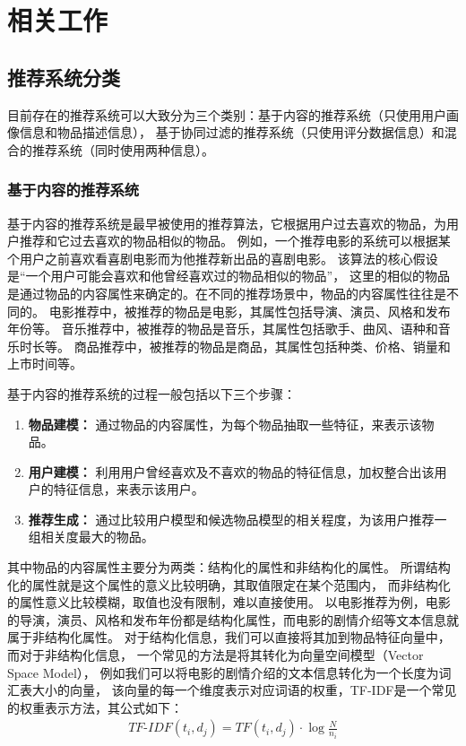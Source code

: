 \chapter{相关工作}
\section{推荐系统分类}
目前存在的推荐系统可以大致分为三个类别：基于内容的推荐系统（只使用用户画像信息和物品描述信息），
基于协同过滤的推荐系统（只使用评分数据信息）和混合的推荐系统（同时使用两种信息）。

\subsection{基于内容的推荐系统}
基于内容的推荐系统是最早被使用的推荐算法，它根据用户过去喜欢的物品，为用户推荐和它过去喜欢的物品相似的物品。
例如，一个推荐电影的系统可以根据某个用户之前喜欢看喜剧电影而为他推荐新出品的喜剧电影。
该算法的核心假设是``一个用户可能会喜欢和他曾经喜欢过的物品相似的物品''，
这里的相似的物品是通过物品的内容属性来确定的。在不同的推荐场景中，物品的内容属性往往是不同的。
电影推荐中，被推荐的物品是电影，其属性包括导演、演员、风格和发布年份等。
音乐推荐中，被推荐的物品是音乐，其属性包括歌手、曲风、语种和音乐时长等。
商品推荐中，被推荐的物品是商品，其属性包括种类、价格、销量和上市时间等。


基于内容的推荐系统的过程一般包括以下三个步骤：
\begin{enumerate}
\item \textbf{物品建模：} 通过物品的内容属性，为每个物品抽取一些特征，来表示该物品。
\item \textbf{用户建模：} 利用用户曾经喜欢及不喜欢的物品的特征信息，加权整合出该用户的特征信息，来表示该用户。
\item \textbf{推荐生成：} 通过比较用户模型和候选物品模型的相关程度，为该用户推荐一组相关度最大的物品。
\end{enumerate}

其中物品的内容属性主要分为两类：结构化的属性和非结构化的属性。
所谓结构化的属性就是这个属性的意义比较明确，其取值限定在某个范围内，
而非结构化的属性意义比较模糊，取值也没有限制，难以直接使用。
以电影推荐为例，电影的导演，演员、风格和发布年份都是结构化属性，而电影的剧情介绍等文本信息就属于非结构化属性。
对于结构化信息，我们可以直接将其加到物品特征向量中，而对于非结构化信息，
一个常见的方法是将其转化为向量空间模型（Vector Space Model），
例如我们可以将电影的剧情介绍的文本信息转化为一个长度为词汇表大小的向量，
该向量的每一个维度表示对应词语的权重，TF-IDF是一个常见的权重表示方法，其公式如下：
\begin{equation}
\begin{split}
TF\textrm{-}IDF(t_i, d_j) = TF(t_i, d_j) \cdot \log{ \frac{N}{n_i} }
\end{split}
\end{equation}

